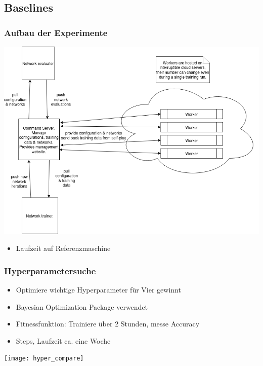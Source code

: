 \subsection{Baselines}



\begin{frame}
 \frametitle{Aufbau der Experimente}
  


\pause
\centering \includegraphics[scale=0.425]{x0_framework_overview}
\begin{itemize}
  \item \pause Laufzeit auf Referenzmaschine
\end{itemize}

  
\end{frame}
\begin{frame}
 \frametitle{Hyperparametersuche}
  


\begin{itemize}
  \item \pause Optimiere wichtige Hyperparameter für Vier gewinnt
  \item \pause Bayesian Optimization Package verwendet
  \item \pause Fitnessfunktion: Trainiere über 2 Stunden, messe Accuracy
  \item {} Steps, Laufzeit ca. eine Woche
\end{itemize}
\pause \centering \texttt{[image: hyper\_compare]}

  
\end{frame}

